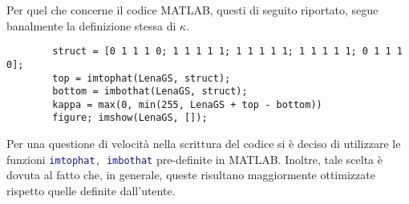 \documentclass{subfiles}
\begin{document}
Per quel che concerne il codice MATLAB, questi di seguito riportato, segue banalmente la definizione stessa di \(\kappa\).
\begin{center}
    \begin{lstlisting}[]
        % caricamento di LenaGS
        struct = [0 1 1 1 0; 1 1 1 1 1; 1 1 1 1 1; 1 1 1 1 1; 0 1 1 1 0];
        top = imtophat(LenaGS, struct);
        bottom = imbothat(LenaGS, struct);
        kappa = max(0, min(255, LenaGS + top - bottom))
        figure; imshow(LenaGS, []);
    \end{lstlisting}
\end{center}

\begin{Note*}
    Per una questione di velocità nella scrittura del codice si è deciso di utilizzare le funzioni \lstinline[language = MATLAB]{imtophat, imbothat} pre-definite in MATLAB.
    Inoltre, tale scelta è dovuta al fatto che, in generale, queste risultano maggiormente ottimizzate rispetto quelle definite dall'utente.
\end{Note*}
\end{document}
